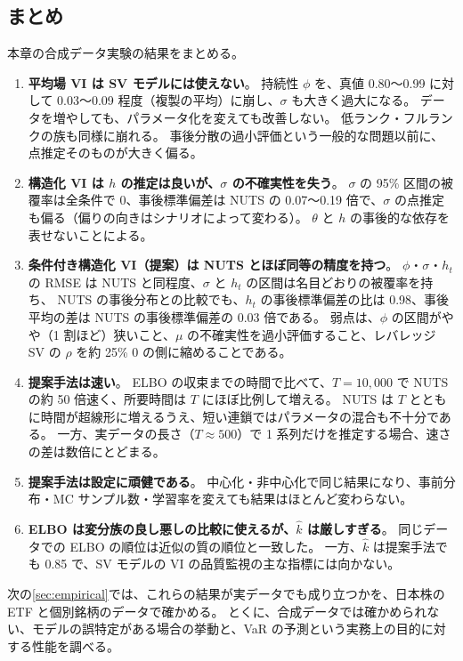 \subsection{まとめ}\label{sec:syn-summary}

本章の合成データ実験の結果をまとめる。

\begin{enumerate}
  \item \textbf{平均場 VI は SV モデルには使えない}。
    持続性 $\phi$ を、真値 0.80〜0.99 に対して 0.03〜0.09 程度（複製の平均）に崩し、$\sigma$ も大きく過大になる。
    データを増やしても、パラメータ化を変えても改善しない。
    低ランク・フルランクの族も同様に崩れる。
    事後分散の過小評価という一般的な問題以前に、点推定そのものが大きく偏る。
  \item \textbf{構造化 VI は $h$ の推定は良いが、$\sigma$ の不確実性を失う}。
    $\sigma$ の 95\% 区間の被覆率は全条件で 0、事後標準偏差は NUTS の 0.07〜0.19 倍で、$\sigma$ の点推定も偏る（偏りの向きはシナリオによって変わる）。
    $\theta$ と $h$ の事後的な依存を表せないことによる。
  \item \textbf{条件付き構造化 VI（提案）は NUTS とほぼ同等の精度を持つ}。
    $\phi$・$\sigma$・$h_t$ の RMSE は NUTS と同程度、$\sigma$ と $h_t$ の区間は名目どおりの被覆率を持ち、
    NUTS の事後分布との比較でも、$h_t$ の事後標準偏差の比は 0.98、事後平均の差は NUTS の事後標準偏差の 0.03 倍である。
    弱点は、$\phi$ の区間がやや（1 割ほど）狭いこと、$\mu$ の不確実性を過小評価すること、レバレッジ SV の $\rho$ を約 25\% 0 の側に縮めることである。
  \item \textbf{提案手法は速い}。
    ELBO の収束までの時間で比べて、$T = 10{,}000$ で NUTS の約 50 倍速く、所要時間は $T$ にほぼ比例して増える。
    NUTS は $T$ とともに時間が超線形に増えるうえ、短い連鎖ではパラメータの混合も不十分である。
    一方、実データの長さ（$T \approx 500$）で 1 系列だけを推定する場合、速さの差は数倍にとどまる。
  \item \textbf{提案手法は設定に頑健である}。
    中心化・非中心化で同じ結果になり、事前分布・MC サンプル数・学習率を変えても結果はほとんど変わらない。
  \item \textbf{ELBO は変分族の良し悪しの比較に使えるが、$\hat k$ は厳しすぎる}。
    同じデータでの ELBO の順位は近似の質の順位と一致した。
    一方、$\hat k$ は提案手法でも 0.85 で、SV モデルの VI の品質監視の主な指標には向かない。
\end{enumerate}

次の\cref{sec:empirical}では、これらの結果が実データでも成り立つかを、日本株の ETF と個別銘柄のデータで確かめる。
とくに、合成データでは確かめられない、モデルの誤特定がある場合の挙動と、VaR の予測という実務上の目的に対する性能を調べる。
